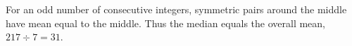 For an odd number of consecutive integers, symmetric pairs around the middle have mean equal to the middle. Thus the median equals the overall mean, $ 217\div7=\boxed{31}$.
